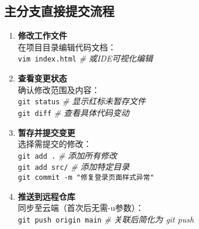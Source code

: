 \subsection{主分支直接提交流程}
\begin{enumerate}[leftmargin=*, nosep]
\item \textbf{修改工作文件} \\
在项目目录编辑代码文档：\\
\texttt{vim index.html} \quad \textit{\# 或IDE可视化编辑}

\item \textbf{查看变更状态} \\
确认修改范围及内容：\\
\texttt{git status} \quad \textit{\# 显示红标未暂存文件} \\
\texttt{git diff} \quad \textit{\# 查看具体代码变动}

\item \textbf{暂存并提交变更} \\
选择需提交的修改：\\
\texttt{git add .} \quad \textit{\# 添加所有修改} \\
\texttt{git add src/} \quad \textit{\# 添加特定目录} \\
\texttt{git commit -m "修复登录页面样式异常"}

\item \textbf{推送到远程仓库} \\
同步至云端（首次后无需-u参数）：\\
\texttt{git push origin main} \quad \textit{\# 关联后简化为 git push}
\end{enumerate}

